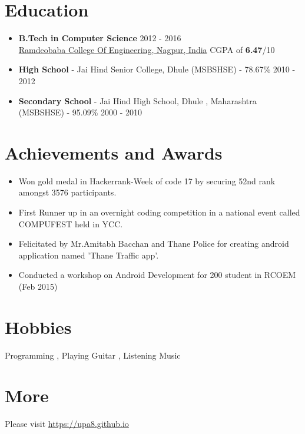 \documentclass[margin, centered]{res}
\begin{document}
\begin{resume}
\section{Education}
\begin{itemize}[leftmargin=*]\item
\textbf{B.Tech in Computer Science} \hfill 2012 - 2016 \\
\href{http://rknec.edu}{Ramdeobaba College Of Engineering, Nagpur, India}
  CGPA of \textbf{6.47}/10
\item\textbf{High School} - {Jai Hind Senior College, Dhule} (MSBSHSE) - 78.67\% \hfill 2010 - 2012 \
\item\textbf{Secondary School} - Jai Hind High School, Dhule , Maharashtra (MSBSHSE) - 95.09\% \hfill 2000 - 2010
\end{itemize}

\section{Achievements and Awards}
\begin{itemize}[leftmargin=*]
 \item Won gold medal in Hackerrank-Week of code 17 by securing 52nd rank amongst 3576 participants. 
 \item First Runner up in an overnight coding competition in a national event called COMPUFEST held in YCC.
 \item Felicitated by Mr.Amitabh Bacchan and Thane Police for creating android application named 'Thane Traffic 
app'.
\item 
 Conducted a workshop on Android Development for 200 student in RCOEM (Feb 2015)
\end{itemize}


\section{Hobbies}
Programming , Playing Guitar , Listening Music 
\section{More}
Please visit \href{https://upa8.github.io}{https://upa8.github.io}
\end{resume}
\end{document}
